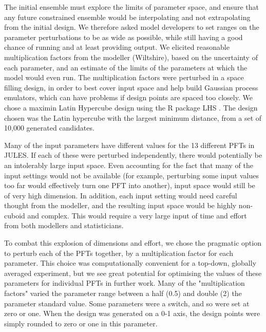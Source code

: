 \documentclass[gmd, manuscript]{copernicus}
\begin{document}
The initial ensemble must explore the limits of parameter space, and ensure that any future constrained ensemble would be interpolating and not extrapolating from the initial design. We therefore asked model developers to set ranges on the parameter perturbations to be as wide as possible, while still having a good chance of running and at least providing output. We elicited reasonable multiplication factors from the modeller (Wiltshire), based on the uncertainty of each parameter, and an estimate of the limits of the parameters at which the model would even run. The multiplication factors were perturbed in a space filling design, in order to best cover input space and help build Gaussian process emulators, which can have problems if design points are spaced too closely. We chose a maximin Latin Hypercube design using the R package LHS \citep{Rpackage2021lhs}. The design chosen was the Latin hypercube with the largest minimum distance, from a set of 10,000 generated candidates.

Many of the input parameters have different values for the 13 different PFTs in JULES. If each of these were perturbed independently, there would potentially be an intolerably large input space. Even accounting for the fact that many of the input settings would not be available (for example, perturbing some input values too far would effectively turn one PFT into another), input space would still be of very high dimension. In addition, each input setting would need careful thought from the modeller, and the resulting input space would be highly non-cuboid and complex. This would require a very large input of time and effort from both modellers and statisticians.

To combat this explosion of dimensions and effort, we chose the pragmatic option to perturb each of the PFTs together, by a multiplication factor for each parameter. This choice was computationally convenient for a top-down, globally averaged experiment, but we see great potential for optimising the values of these parameters for individual PFTs in further work. Many of the "multiplication factors" varied the parameter range between a half (0.5) and double (2) the parameter standard value. Some parameters were a switch, and so were set at zero or one. When the design was generated on a 0-1 axis, the design points were simply rounded to zero or one in this parameter.
\end{document}
